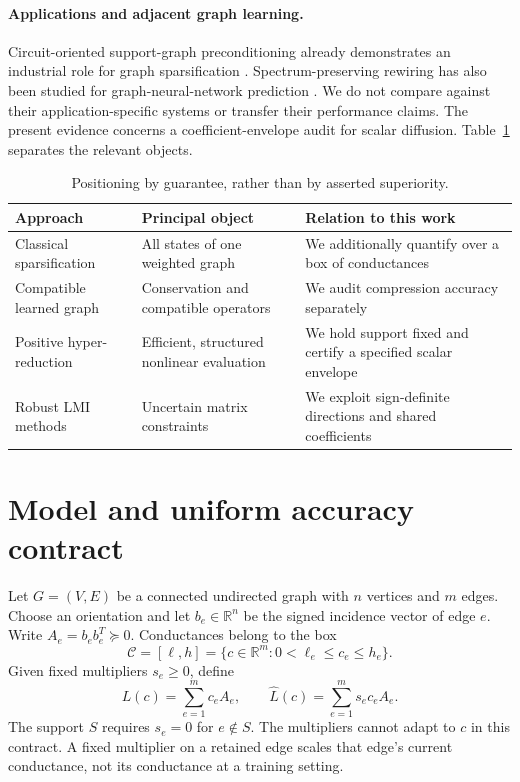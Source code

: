 \documentclass[11pt]{article}
\newcommand{\R}{\mathbb R}
\newcommand{\Lo}{\widehat L}
\begin{document}
\paragraph{Applications and adjacent graph learning.}
Circuit-oriented support-graph preconditioning already demonstrates an industrial role for graph sparsification \cite{zhao}. Spectrum-preserving rewiring has also been studied for graph-neural-network prediction \cite{liang}. We do not compare against their application-specific systems or transfer their performance claims. The present evidence concerns a coefficient-envelope audit for scalar diffusion. Table~\ref{tab:position} separates the relevant objects.

\begin{table}[t]\centering\small
\caption{Positioning by guarantee, rather than by asserted superiority.}\label{tab:position}
\begin{tabular}{p{.25\linewidth}p{.31\linewidth}p{.34\linewidth}}\toprule
Approach & Principal object & Relation to this work\\\midrule
Classical sparsification & All states of one weighted graph & We additionally quantify over a box of conductances\\
Compatible learned graph & Conservation and compatible operators & We audit compression accuracy separately\\
Positive hyper-reduction & Efficient, structured nonlinear evaluation & We hold support fixed and certify a specified scalar envelope\\
Robust LMI methods & Uncertain matrix constraints & We exploit sign-definite directions and shared coefficients\\\bottomrule
\end{tabular}
\end{table}

\section{Model and uniform accuracy contract}
Let $G=(V,E)$ be a connected undirected graph with $n$ vertices and $m$ edges. Choose an orientation and let $b_e\in\R^n$ be the signed incidence vector of edge $e$. Write $A_e=b_eb_e^T\succeq0$. Conductances belong to the box
\begin{equation}
\mathcal C=[\ell,h]=\{c\in\R^m:0<\ell_e\le c_e\le h_e\}.
\end{equation}
Given fixed multipliers $s_e\ge0$, define
\begin{equation}\label{eq:operators}
L(c)=\sum_{e=1}^m c_eA_e,
\qquad \Lo(c)=\sum_{e=1}^m s_ec_eA_e.
\end{equation}
The support $S$ requires $s_e=0$ for $e\notin S$. The multipliers cannot adapt to $c$ in this contract. A fixed multiplier on a retained edge scales that edge's current conductance, not its conductance at a training setting.
\end{document}
